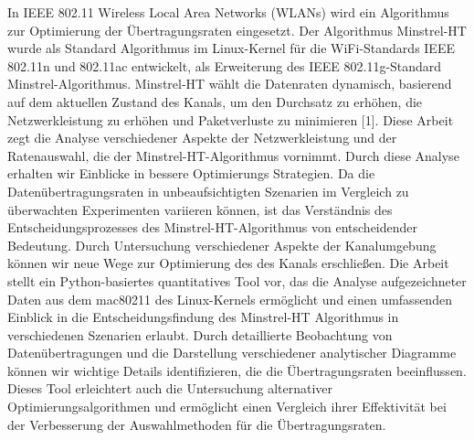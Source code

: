 In IEEE 802.11 Wireless Local Area Networks (WLANs) wird ein Algorithmus zur Optimierung der Übertragungsraten eingesetzt. Der Algorithmus Minstrel-HT wurde als Standard Algorithmus im Linux-Kernel für die WiFi-Standards IEEE 802.11n und 802.11ac entwickelt,
als Erweiterung des  IEEE 802.11g-Standard Minstrel-Algorithmus. Minstrel-HT wählt die Datenraten dynamisch, basierend auf dem aktuellen Zustand des Kanals, um den Durchsatz zu erhöhen, die Netzwerkleistung zu erhöhen und Paketverluste zu minimieren [1].
Diese Arbeit zegt die Analyse verschiedener Aspekte der Netzwerkleistung und der Ratenauswahl,
die der Minstrel-HT-Algorithmus vornimmt. Durch diese Analyse erhalten wir Einblicke in bessere Optimierungs
Strategien. 
Da die Datenübertragungsraten in unbeaufsichtigten Szenarien im Vergleich zu überwachten Experimenten variieren können, ist das Verständnis des Entscheidungsprozesses des Minstrel-HT-Algorithmus von entscheidender Bedeutung. Durch
Untersuchung verschiedener Aspekte der Kanalumgebung können wir neue Wege zur Optimierung des
des Kanals erschließen.
Die Arbeit stellt ein Python-basiertes quantitatives Tool vor, das die Analyse aufgezeichneter Daten aus dem mac80211 des Linux-Kernels ermöglicht und einen umfassenden Einblick in die Entscheidungsfindung des Minstrel-HT
Algorithmus in verschiedenen Szenarien erlaubt. Durch detaillierte Beobachtung von Datenübertragungen
und die Darstellung verschiedener analytischer Diagramme können wir wichtige Details identifizieren, 
die die Übertragungsraten beeinflussen. Dieses Tool erleichtert auch die Untersuchung alternativer Optimierungsalgorithmen und ermöglicht einen
Vergleich ihrer Effektivität bei der Verbesserung der Auswahlmethoden für die Übertragungsraten.






